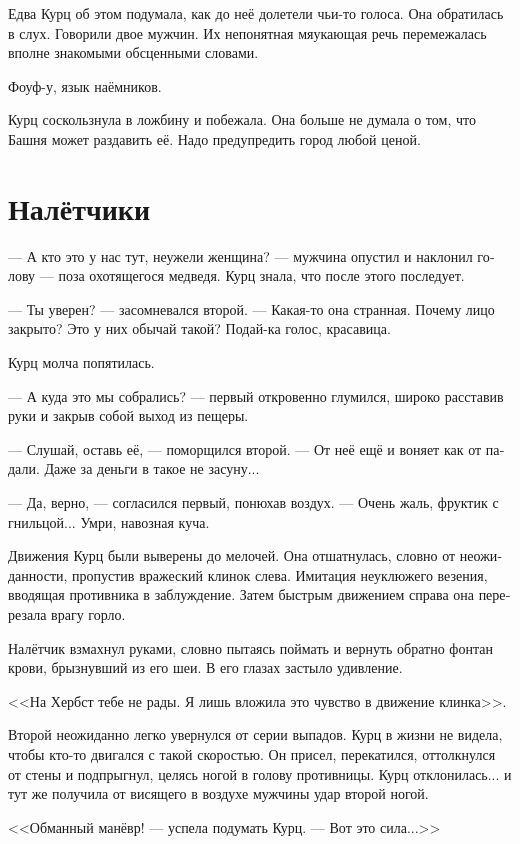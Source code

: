 \documentclass[a4paper,10pt,fleqn]{book}\usepackage{polyglossia}\setdefaultlanguage[babelshorthands=true]{russian}\setotherlanguage{english}\defaultfontfeatures{Ligatures=TeX,Mapping=tex-text}\usepackage{xcolor}\newcommand{\ml}[3]{#2}
\begin{document}
Едва Курц об этом подумала, как до неё долетели чьи-то голоса.
Она обратилась в слух.
Говорили двое мужчин.
Их непонятная мяукающая речь перемежалась вполне знакомыми обсценными словами.

Фоуф-у, язык наёмников.

Курц соскользнула в ложбину и побежала.
Она больше не думала о том, что Башня может раздавить её.
Надо предупредить город любой ценой.

\section{Налётчики}

--- А кто это у нас тут, неужели женщина? --- мужчина опустил и наклонил голову --- поза охотящегося медведя.
Курц знала, что после этого последует.

--- Ты уверен? --- засомневался второй.
--- Какая-то она странная.
Почему лицо закрыто?
Это у них обычай такой?
Подай-ка голос, красавица.

Курц молча попятилась.

--- А куда это мы собрались? --- первый откровенно глумился, широко расставив руки и закрыв собой выход из пещеры.

--- Слушай, оставь её, --- поморщился второй.
--- От неё ещё и воняет как от падали.
Даже за деньги в такое не засуну...

--- Да, верно, --- согласился первый, понюхав воздух.
--- Очень жаль, фруктик с гнильцой...
Умри, навозная куча.

Движения Курц были выверены до мелочей.
Она отшатнулась, словно от неожиданности, пропустив вражеский клинок слева.
Имитация неуклюжего везения, вводящая противника в заблуждение.
Затем быстрым движением справа она перерезала врагу горло.

Налётчик взмахнул руками, словно пытаясь поймать и вернуть обратно фонтан крови, брызнувший из его шеи.
В его глазах застыло удивление.

<<На Хербст тебе не рады.
Я лишь вложила это чувство в движение клинка>>.

Второй неожиданно легко увернулся от серии выпадов.
Курц в жизни не видела, чтобы кто-то двигался с такой скоростью.
Он присел, перекатился, оттолкнулся от стены и подпрыгнул, целясь ногой в голову противницы.
Курц отклонилась... и тут же получила от висящего в воздухе мужчины удар второй ногой.

<<Обманный манёвр! --- успела подумать Курц.
--- Вот это сила...>>
\end{document}

